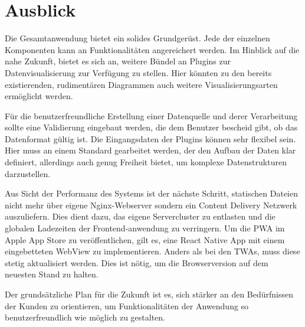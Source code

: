 \chapter{Ausblick}
\label{chap:ausblick}

Die Gesamtanwendung bietet ein solides Grundgerüst. Jede der einzelnen Komponenten
kann an Funktionalitäten angereichert werden. Im Hinblick auf die nahe Zukunft, bietet es sich an,
weitere Bündel an Plugins zur Datenvisualisierung zur Verfügung zu stellen. Hier könnten
zu den bereits existierenden, rudimentären Diagrammen auch weitere Visualisierungsarten ermöglicht
werden.

Für die benutzerfreundliche Erstellung einer Datenquelle und derer Verarbeitung
sollte eine Validierung eingebaut werden, die dem Benutzer bescheid gibt, ob das Datenformat
gültig ist. Die Eingangsdaten der Plugins können sehr flexibel sein. Hier muss an einem Standard
gearbeitet werden, der den Aufbau der Daten klar definiert, allerdings auch genug Freiheit bietet,
um komplexe Datenstrukturen darzustellen.

Aus Sicht der Performanz des Systems ist der nächste
Schritt, statischen Dateien nicht mehr über eigene Nginx-Webserver sondern ein
Content Delivery Netzwerk auszuliefern. Dies dient dazu, das eigene Servercluster
zu entlasten und die globalen Ladezeiten der Frontend-anwendung zu verringern.
Um die PWA im Apple App Store zu veröffentlichen, gilt es, eine React Native
App mit einem eingebetteten WebView zu implementieren. Anders als bei den TWAs, muss
diese stetig aktualisiert werden. Dies ist nötig, um die Browserversion auf
dem neuesten Stand zu halten.

Der grundsätzliche Plan für die Zukunft ist es, sich stärker an den
Bedürfnissen der Kunden zu orientieren, um Funktionalitäten der Anwendung
so benutzerfreundlich wie möglich zu gestalten.
